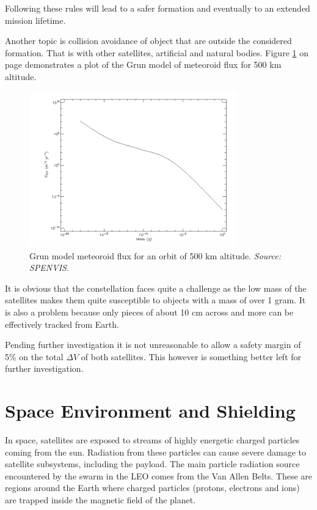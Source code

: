 Following these rules will lead to a safer formation and eventually to an extended mission lifetime.

Another topic is collision avoidance of object that are outside the considered formation. That is with other satellites, artificial and natural bodies. Figure \ref{fig:meteor} on page \pageref{fig:meteor} demonstrates a plot of the Grun model of meteoroid flux for 500 km altitude.

\begin{figure}[ht!]
\centering
\includegraphics[width = 0.8\textwidth]{chapters/img/meteoroid.png}
\caption{Grun model meteoroid flux for an orbit of 500 km altitude. \emph{Source: SPENVIS}. }
\label{fig:meteor}
\end{figure}

It is obvious that the constellation faces quite a challenge as the low mass of the satellites makes them quite susceptible to objects with a mass of over 1 gram. It is also a problem because only pieces of about 10 cm across and more can be effectively tracked from Earth.

Pending further investigation it is not unreasonable to allow a safety margin of 5\% on the total $\Delta V$ of both satellites. This however is something better left for further investigation.

\section{Space Environment and Shielding}
\label{frSEaS}

In space, satellites are exposed to streams of highly energetic charged particles coming from the sun. Radiation from these particles can cause severe damage to satellite subsystems, including the payload. The main particle radiation source encountered by the swarm in the \ac{LEO} comes from the Van Allen Belts. These are regions around the Earth where charged particles (protons, electrons and ions) are trapped inside the magnetic field of the planet.

